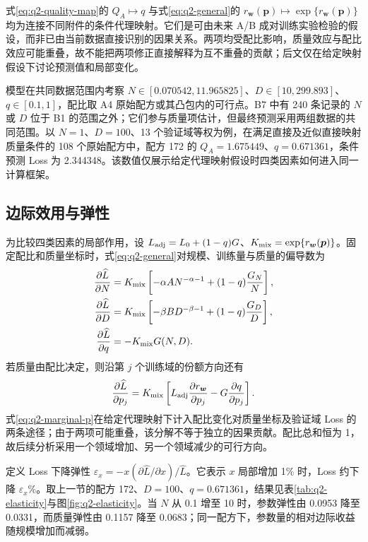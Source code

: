 式\eqref{eq:q2-quality-map}的 $Q_A\mapsto q$ 与式\eqref{eq:q2-general}的 $r_{\boldsymbol w}(\boldsymbol p)\mapsto\exp\{r_{\boldsymbol w}(\boldsymbol p)\}$ 均为连接不同附件的条件代理映射。它们是可由未来 A/B 成对训练实验检验的假设，而非已由当前数据直接识别的因果关系。两项均受配比影响，质量效应与配比效应可能重叠，故不能把两项修正直接解释为互不重叠的贡献；后文仅在给定映射假设下讨论预测值和局部变化。

模型在共同数据范围内考察 $N\in[0.070542,11.965825]$、$D\in[10,299.893]$、$q\in[0.1,1]$，配比取 A4 原始配方或其凸包内的可行点。B7 中有 240 条记录的 $N$ 或 $D$ 位于 B1 的范围之外；它们参与质量项估计，但最终预测采用两组数据的共同范围。以 $N=1$、$D=100$、13 个验证域等权为例，在满足直接及近似直接映射质量条件的 108 个原始配方中，配方 172 的 $Q_A=1.675449$、$q=0.671361$，条件预测 Loss 为 2.344348。该数值仅展示给定代理映射假设时四类因素如何进入同一计算框架。

\subsection{边际效用与弹性}

为比较四类因素的局部作用，设 $L_{\rm adj}=L_0+(1-q)G$、$K_{\rm mix}=\exp\{r_{\boldsymbol w}(\boldsymbol p)\}$。固定配比和质量坐标时，式\eqref{eq:q2-general}对规模、训练量与质量的偏导数为
\begin{align}
 \frac{\partial\widehat L}{\partial N}
 &=K_{\rm mix}\left[-\alpha AN^{-\alpha-1}
             +(1-q)\frac{G_N}{N}\right],\label{eq:q2-marginal-n}\\
 \frac{\partial\widehat L}{\partial D}
 &=K_{\rm mix}\left[-\beta BD^{-\beta-1}
             +(1-q)\frac{G_D}{D}\right],\label{eq:q2-marginal-d}\\
 \frac{\partial\widehat L}{\partial q}&=-K_{\rm mix}G(N,D).\label{eq:q2-marginal-q}
\end{align}
若质量由配比决定，则沿第 $j$ 个训练域的份额方向还有
\begin{equation}
 \frac{\partial\widehat L}{\partial p_j}
 =K_{\rm mix}\left[L_{\rm adj}\frac{\partial r_{\boldsymbol w}}{\partial p_j}
       -G\frac{\partial q}{\partial p_j}\right].
 \label{eq:q2-marginal-p}
\end{equation}
式\eqref{eq:q2-marginal-p}在给定代理映射下计入配比变化对质量坐标及验证域 Loss 的两条途径；由于两项可能重叠，该分解不等于独立的因果贡献。配比总和恒为 1，故后续分析采用一个领域增加、另一个领域减少的可行方向。

定义 Loss 下降弹性 $\varepsilon_x=-x(\partial\widehat L/\partial x)/\widehat L$。它表示 $x$ 局部增加 1\% 时，Loss 约下降 $\varepsilon_x$\%。取上一节的配方 172、$D=100$、$q=0.671361$，结果见表\ref{tab:q2-elasticity}与图\ref{fig:q2-elasticity}。当 $N$ 从 0.1 增至 10 时，参数弹性由 0.0953 降至 0.0331，而质量弹性由 0.1157 降至 0.0683；同一配方下，参数量的相对边际收益随规模增加而减弱。

